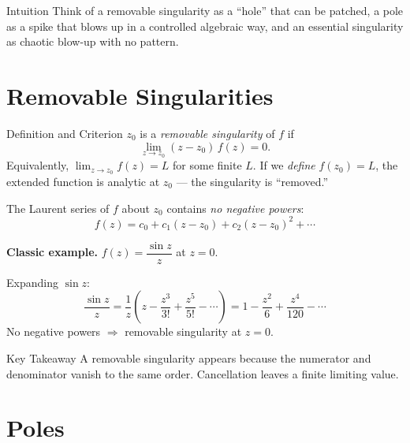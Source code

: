 \documentclass[12pt,a4paper]{article}
\begin{document}
\begin{learnbox}{Intuition}
Think of a removable singularity as a ``hole'' that can be patched, a pole as a spike that blows
up in a controlled algebraic way, and an essential singularity as chaotic blow-up with no pattern.
\end{learnbox}

\section{Removable Singularities}

\begin{infobox}{Definition and Criterion}
$z_0$ is a \emph{removable singularity} of $f$ if
\[
  \lim_{z \to z_0} (z - z_0)\, f(z) = 0.
\]
Equivalently, $\lim_{z\to z_0} f(z) = L$ for some finite $L$.  
If we \emph{define} $f(z_0) = L$, the extended function is analytic at $z_0$ --- the singularity
is ``removed.''

The Laurent series of $f$ about $z_0$ contains \emph{no negative powers}:
\[
  f(z) = c_0 + c_1(z-z_0) + c_2(z-z_0)^2 + \cdots
\]
\end{infobox}

\textbf{Classic example.}
$f(z) = \dfrac{\sin z}{z}$ at $z = 0$.

Expanding $\sin z$:
\[
  \frac{\sin z}{z} = \frac{1}{z}\!\left(z - \frac{z^3}{3!} + \frac{z^5}{5!} - \cdots\right)
  = 1 - \frac{z^2}{6} + \frac{z^4}{120} - \cdots
\]
No negative powers $\Rightarrow$ removable singularity at $z = 0$.

\begin{learnbox}{Key Takeaway}
A removable singularity appears because the numerator and denominator vanish to the same order.
Cancellation leaves a finite limiting value.
\end{learnbox}

\section{Poles}
\end{document}
